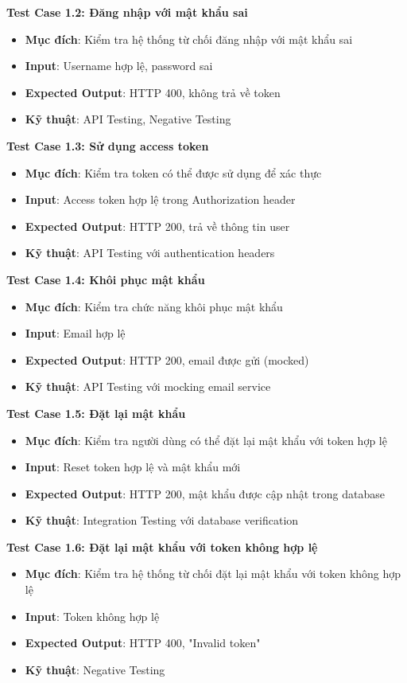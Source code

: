 \documentclass[../DoAn.tex]{subfiles}
\begin{document}
\textbf{Test Case 1.2: Đăng nhập với mật khẩu sai}
\begin{itemize}
    \item \textbf{Mục đích}: Kiểm tra hệ thống từ chối đăng nhập với mật khẩu sai
    \item \textbf{Input}: Username hợp lệ, password sai
    \item \textbf{Expected Output}: HTTP 400, không trả về token
    \item \textbf{Kỹ thuật}: API Testing, Negative Testing
\end{itemize}

\textbf{Test Case 1.3: Sử dụng access token}
\begin{itemize}
    \item \textbf{Mục đích}: Kiểm tra token có thể được sử dụng để xác thực
    \item \textbf{Input}: Access token hợp lệ trong Authorization header
    \item \textbf{Expected Output}: HTTP 200, trả về thông tin user
    \item \textbf{Kỹ thuật}: API Testing với authentication headers
\end{itemize}

\textbf{Test Case 1.4: Khôi phục mật khẩu}
\begin{itemize}
    \item \textbf{Mục đích}: Kiểm tra chức năng khôi phục mật khẩu
    \item \textbf{Input}: Email hợp lệ
    \item \textbf{Expected Output}: HTTP 200, email được gửi (mocked)
    \item \textbf{Kỹ thuật}: API Testing với mocking email service
\end{itemize}

\textbf{Test Case 1.5: Đặt lại mật khẩu}
\begin{itemize}
    \item \textbf{Mục đích}: Kiểm tra người dùng có thể đặt lại mật khẩu với token hợp lệ
    \item \textbf{Input}: Reset token hợp lệ và mật khẩu mới
    \item \textbf{Expected Output}: HTTP 200, mật khẩu được cập nhật trong database
    \item \textbf{Kỹ thuật}: Integration Testing với database verification
\end{itemize}

\textbf{Test Case 1.6: Đặt lại mật khẩu với token không hợp lệ}
\begin{itemize}
    \item \textbf{Mục đích}: Kiểm tra hệ thống từ chối đặt lại mật khẩu với token không hợp lệ
    \item \textbf{Input}: Token không hợp lệ
    \item \textbf{Expected Output}: HTTP 400, "Invalid token"
    \item \textbf{Kỹ thuật}: Negative Testing
\end{itemize}
\end{document}
